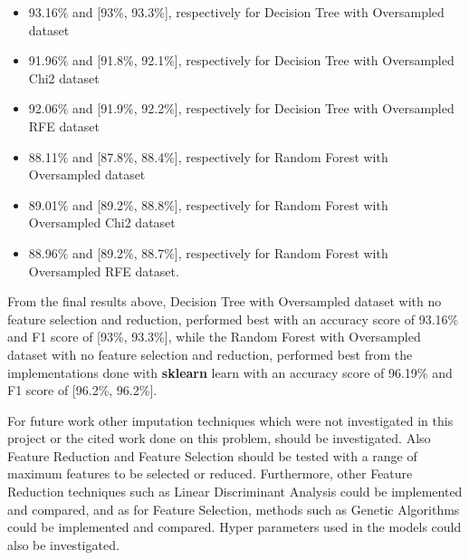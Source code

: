 \begin{itemize}
\itemsep0em
    \item 93.16\% and [93\%, 93.3\%], respectively for Decision Tree with Oversampled dataset
    \item 91.96\% and [91.8\%, 92.1\%], respectively for Decision Tree with Oversampled Chi2 dataset
    \item 92.06\% and [91.9\%, 92.2\%], respectively for Decision Tree with Oversampled RFE dataset
    \item 88.11\% and [87.8\%, 88.4\%], respectively for Random Forest with Oversampled dataset
    \item 89.01\% and [89.2\%, 88.8\%], respectively for Random Forest with Oversampled Chi2 dataset
    \item 88.96\% and [89.2\%, 88.7\%], respectively for Random Forest with Oversampled RFE dataset.
\end{itemize}

\noindent From the final results above, Decision Tree with Oversampled dataset with no feature selection and reduction, performed best with an accuracy score of 93.16\% and F1 score of [93\%, 93.3\%], while the Random Forest with Oversampled dataset with no feature selection and reduction, performed best from the implementations done with \textbf{sklearn} learn with an accuracy score of 96.19\% and F1 score of [96.2\%, 96.2\%].

\noindent For future work other imputation techniques which were not investigated in this project or the cited work \cite{saisree:github} done on this problem, should be investigated. Also Feature Reduction and Feature Selection should be tested with a range of maximum features to be selected or reduced. Furthermore, other Feature Reduction techniques such as Linear Discriminant Analysis could be implemented and compared, and as for Feature Selection, methods such as Genetic Algorithms could be implemented and compared. Hyper parameters used in the models could also be investigated.


